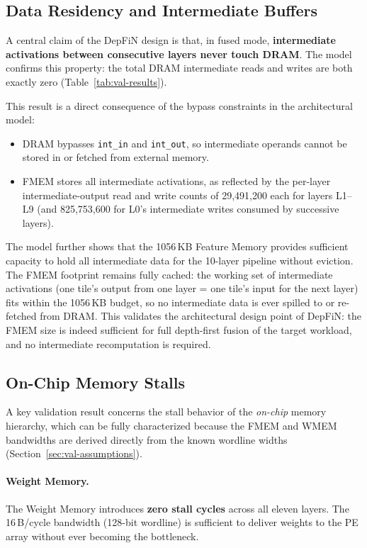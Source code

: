 \subsection{Data Residency and Intermediate Buffers}
\label{sec:val-data-residency}

A central claim of the DepFiN design is that, in fused mode,
\textbf{intermediate activations between consecutive layers never
touch DRAM}.
The model confirms this property: the total DRAM intermediate reads
and writes are both exactly zero (Table~\ref{tab:val-results}).

This result is a direct consequence of the bypass constraints in the
architectural model:
\begin{itemize}
  \item DRAM bypasses \texttt{int\_in} and \texttt{int\_out}, so
        intermediate operands cannot be stored in or fetched from
        external memory.
  \item FMEM stores all intermediate activations, as reflected by the
        per-layer intermediate-output read and write counts of
        29,491,200 each for layers L1--L9 (and 825,753,600 for L0's
        intermediate writes consumed by successive layers).
\end{itemize}

The model further shows that the 1056\,KB Feature Memory provides
sufficient capacity to hold all intermediate data for the 10-layer
pipeline without eviction.
The FMEM footprint remains fully cached: the working set of
intermediate activations (one tile's output from one layer = one
tile's input for the next layer) fits within the 1056\,KB budget,
so no intermediate data is ever spilled to or re-fetched from DRAM.
This validates the architectural design point of DepFiN: the FMEM size
is indeed sufficient for full depth-first fusion of the target
workload, and no intermediate recomputation is required.


\subsection{On-Chip Memory Stalls}
\label{sec:val-stalls}

A key validation result concerns the stall behavior of the
\emph{on-chip} memory hierarchy, which can be fully characterized
because the FMEM and WMEM bandwidths are derived directly from the
known wordline widths (Section~\ref{sec:val-assumptions}).

\paragraph{Weight Memory.}
The Weight Memory introduces \textbf{zero stall cycles} across all
eleven layers.
The 16\,B/cycle bandwidth (128-bit wordline) is sufficient to deliver
weights to the PE array without ever becoming the bottleneck.

